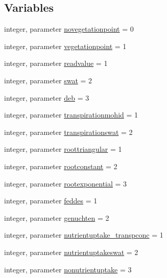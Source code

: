 \subsection*{Variables}
\begin{DoxyCompactItemize}
\item 
integer, parameter \mbox{\hyperlink{namespacemodulevegetation_a8001bdebe574da77fb147554fe710c49}{novegetationpoint}} = 0
\item 
integer, parameter \mbox{\hyperlink{namespacemodulevegetation_aa9569bdafa4413cbb392ae1e779009ae}{vegetationpoint}} = 1
\item 
integer, parameter \mbox{\hyperlink{namespacemodulevegetation_a8d4baebef6e48e57e05cd43519646f2a}{readvalue}} = 1
\item 
integer, parameter \mbox{\hyperlink{namespacemodulevegetation_a48e2a8877a184cb485dc25163f2978cb}{swat}} = 2
\item 
integer, parameter \mbox{\hyperlink{namespacemodulevegetation_a11f2fa58a2f5c093c626318c96888161}{deb}} = 3
\item 
integer, parameter \mbox{\hyperlink{namespacemodulevegetation_acc35043b309d61209624f0904e30ceda}{transpirationmohid}} = 1
\item 
integer, parameter \mbox{\hyperlink{namespacemodulevegetation_aa71bc8152aec332d7671b6dbc3200160}{transpirationswat}} = 2
\item 
integer, parameter \mbox{\hyperlink{namespacemodulevegetation_abb03d062ddc11fc356bc1b6ac2db658a}{roottriangular}} = 1
\item 
integer, parameter \mbox{\hyperlink{namespacemodulevegetation_a4e0ef12556472447215a8ef1e6a670ee}{rootconstant}} = 2
\item 
integer, parameter \mbox{\hyperlink{namespacemodulevegetation_a1e316a9214fb589d7fd3a4e03adff766}{rootexponential}} = 3
\item 
integer, parameter \mbox{\hyperlink{namespacemodulevegetation_a74beec691fce5d94a352b5c0678b7bb5}{feddes}} = 1
\item 
integer, parameter \mbox{\hyperlink{namespacemodulevegetation_a9ad121105341943b97d746a6ee173103}{genuchten}} = 2
\item 
integer, parameter \mbox{\hyperlink{namespacemodulevegetation_a00022541edabc4f88cdf40358ea4c062}{nutrientuptake\+\_\+transpconc}} = 1
\item 
integer, parameter \mbox{\hyperlink{namespacemodulevegetation_ae972c42e63c952384ea85f900c6d83ce}{nutrientuptakeswat}} = 2
\item 
integer, parameter \mbox{\hyperlink{namespacemodulevegetation_adb9411841d04fe23f0b3e26d0cfa4da6}{nonutrientuptake}} = 3

\end{DoxyCompactItemize}
